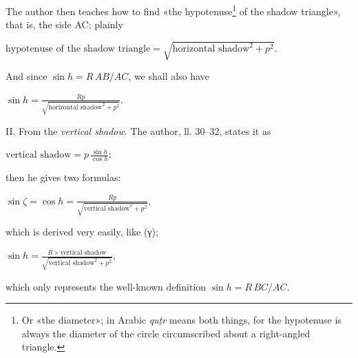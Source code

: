 \documentclass[11pt]{article}
\begin{document}
\par The author then teaches how to find «the hypotenuse\footnote{Or «the diameter»; in Arabic \emph{quṭr} means both things, for the hypotenuse is always the diameter of the circle circumscribed about a right-angled triangle.} of the shadow triangle», that is, the side AC; plainly \par\noindent\hspace*{1.5em}$\displaystyle \text{hypotenuse of the shadow triangle} = \sqrt{\text{horizontal shadow}^2 + p^2}.$\par And since $\sin h = R\,AB/AC$, we shall also have \par\noindent\hspace*{1.5em}$\displaystyle \sin h = \frac{Rp}{\sqrt{\text{horizontal shadow}^2 + p^2}}.$\par\par
\par II. From the \emph{vertical shadow}. The author, ll. 30–32, states it as \par\noindent\hspace*{1.5em}$\displaystyle \text{vertical shadow} = p\,\frac{\sin h}{\cos h};$\par\par
\begin{center}\end{center}
\par then he gives two formulas: \par\noindent\hspace*{1.5em}$\displaystyle \sin\zeta = \cos h = \frac{Rp}{\sqrt{\text{vertical shadow}^2 + p^2}},$\par which is derived very easily, like ({\greekfont γ}); \par\noindent\hspace*{1.5em}$\displaystyle \sin h = \frac{R \times \text{vertical shadow}}{\sqrt{\text{vertical shadow}^2 + p^2}},$\par which only represents the well-known definition $\sin h = R\,BC/AC$.\par
\end{document}
